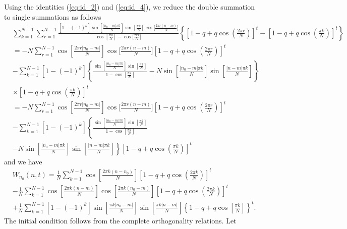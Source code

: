 \documentclass[superscriptaddress, amsmath, amssymb, aps, pre, floatfix]{revtex4-2}
\begin{document}
Using the identities (\ref{eq:id_2}) and (\ref{eq:id_4}), we reduce the double summation to single summations as follows
\begin{align}
&\sum_{k=1}^{N-1}\sum_{r=1}^{N-1}\frac{\left[1-(-1)^k\right]\sin\left[\frac{|n_0-m|\pi k}{N}\right]\sin\left[\frac{\pi k}{N}\right]\cos\Big[\frac{2\pi r (n-m)}{N}\Big]}{\cos\left[\frac{\pi k}{N}\right]-\cos\Big[\frac{2\pi r}{N}\Big]}\left\{\left[1-q+q\cos\left(\frac{2\pi r}{N}\right)\right]^t-\left[1-q+q\cos\left(\frac{\pi k}{N}\right)\right]^t\right\} \nonumber \\
&=-N\sum_{r=1}^{N-1}\cos\left[\frac{2\pi r|n_0-m|}{N}\right]\cos\Big[\frac{2\pi r (n-m)}{N}\Big]\left[1-q+q\cos\left(\frac{2\pi r}{N}\right)\right]^t \nonumber \\
&-\sum_{k=1}^{N-1}\left[1-(-1)^k\right]\left\{\frac{\sin\left[\frac{|n_0-m|\pi k}{N}\right]\sin\left[\frac{\pi k}{N}\right]}{1-\cos\left[\frac{\pi k}{N}\right]}-N\sin\left[\frac{|n_0-m|\pi k}{N}\right]\sin\left[\frac{|n-m|\pi k}{N}\right]\right\}\nonumber \\
&\times \left[1-q+q\cos\left(\frac{\pi k}{N}\right)\right]^t\nonumber \\
&=-N\sum_{r=1}^{N-1}\cos\left[\frac{2\pi r|n_0-m|}{N}\right]\cos\Big[\frac{2\pi r (n-m)}{N}\Big]\left[1-q+q\cos\left(\frac{2\pi r}{N}\right)\right]^t \nonumber \\
&-\sum_{k=1}^{N-1}\left[1-(-1)^k\right]\left\{\frac{\sin\left[\frac{|n_0-m|\pi k}{N}\right]\sin\left[\frac{\pi k}{N}\right]}{1-\cos\left[\frac{\pi k}{N}\right]}\right. \nonumber \\
&\left.-N\sin\left[\frac{|n_0-m|\pi k }{N}\right]\sin\left[\frac{|n-m|\pi k}{N}\right]\right\}\left[1-q+q\cos\left(\frac{\pi k }{N}\right)\right]^t
\end{align}
and we have
\begin{align}
&W_{n_0}(n,t)= \frac{1}{N}\sum_{k=1}^{N-1}\cos\left[\frac{2\pi k (n-n_0)}{N}\right]\left[1-q+q\cos\left(\frac{2\pi k}{N}\right)\right]^t \nonumber \\
&-   \frac{1}{N}\sum_{k=1}^{N-1}\cos\left[\frac{2\pi k (n-m)}{N}\right]\cos\left[\frac{2\pi k (n_0-m)}{N}\right]\left[1-q+q\cos\left(\frac{2\pi k}{N}\right)\right]^t\    \nonumber \\
&+\frac{1}{N}\sum_{k=1}^{N-1}\left[1-(-1)^k\right]\sin\left[\frac{\pi k |n_0-m|}{N}\right]\sin\left[\frac{\pi k |n-m|}{N}\right]\left\{1-q+q\cos\left[\frac{ \pi k}{N}\right]\right\}^t.
\label{eq:prob-time}
\end{align}
The initial condition follows from the complete orthogonality relations.  Let
\end{document}
